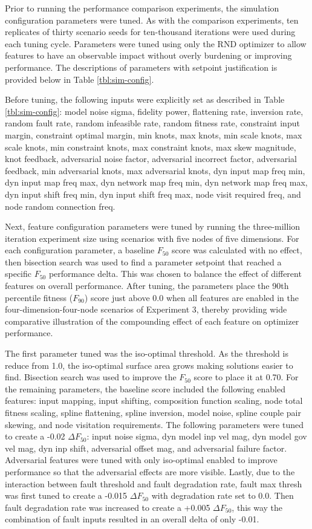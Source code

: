 \documentclass[a4paper]{article}
\begin{document}
Prior to running the performance comparison experiments, the simulation configuration parameters were tuned. As with the comparison experiments, ten replicates of thirty scenario seeds for ten-thousand iterations were used during each tuning cycle. Parameters were tuned using only the RND optimizer to allow features to have an observable impact without overly burdening or improving performance. The descriptions of parameters with setpoint justification is provided below in Table \ref{tbl:sim-config}.

Before tuning, the following inputs were explicitly set as described in Table \ref{tbl:sim-config}: model noise sigma, fidelity power, flattening rate, inversion rate, random fault rate, random infeasible rate, random fitness rate, constraint input margin, constraint optimal margin, min knots, max knots, min scale knots, max scale knots, min constraint knots, max constraint knots, max skew magnitude, knot feedback, adversarial noise factor, adversarial incorrect factor, adversarial feedback, min adversarial knots, max adversarial knots, dyn input map freq min, dyn input map freq max, dyn network map freq min, dyn network map freq max, dyn input shift freq min, dyn input shift freq max, node visit required freq, and node random connection freq.

Next, feature configuration parameters were tuned by running the three-million iteration experiment size using scenarios with five nodes of five dimensions. For each configuration parameter, a baseline $F_{50}$ score was calculated with no effect, then bisection search was used to find a parameter setpoint that reached a specific $F_{50}$ performance delta. This was chosen to balance the effect of different features on overall performance. After tuning, the parameters place the 90th percentile fitness ($F_{90}$) score just above 0.0 when all features are enabled in the four-dimension-four-node scenarios of Experiment 3, thereby providing wide comparative illustration of the compounding effect of each feature on optimizer performance.

The first parameter tuned was the iso-optimal threshold. As the threshold is reduce from 1.0, the iso-optimal surface area grows making solutions easier to find. Bisection search was used to improve the $F_{50}$ score to place it at 0.70. For the remaining parameters, the baseline score included the following enabled features: input mapping, input shifting, composition function scaling, node total fitness scaling, spline flattening, spline inversion, model noise, spline couple pair skewing, and node visitation requirements. The following parameters were tuned to create a -0.02 $\Delta F_{50}$: input noise sigma, dyn model inp vel mag, dyn model gov vel mag, dyn inp shift, adversarial offset mag, and adversarial failure factor. Adversarial features were tuned with only iso-optimal enabled to improve performance so that the adversarial effects are more visible. Lastly, due to the interaction between fault threshold and fault degradation rate, fault max thresh was first tuned to create a -0.015 $\Delta F_{50}$ with degradation rate set to 0.0. Then fault degradation rate was increased to create a +0.005 $\Delta F_{50}$, this way the combination of fault inputs resulted in an overall delta of only -0.01.
\end{document}
